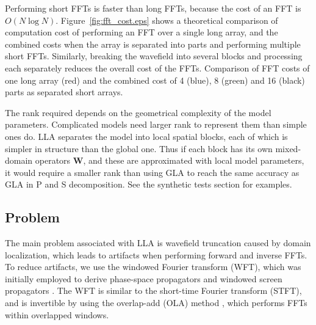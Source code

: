 \documentclass[manuscript,ulem,graphix,revised]{geophysics}
\begin{document}
Performing short FFTs is faster than long FFTs, because the cost of an FFT is $O(N\log{N})$. Figure~\ref{fig:fft_cost.eps} shows a theoretical comparison of computation cost of performing an FFT over a single long array, and the combined costs when the array is separated into parts and performing multiple short FFTs. 
Similarly, breaking the wavefield into several blocks and processing each separately reduces the overall cost of the FFTs. 
{
Comparison of FFT costs of one long array (red) and the combined cost of 4 (blue), 8 (green) and 16 (black) parts as separated short arrays.
}


The rank required depends on the geometrical complexity of the model parameters. Complicated models need larger rank to represent them than simple ones do. LLA separates the model into local spatial blocks, each of which is simpler in structure than the global one. Thus if each block has its own mixed-domain operators $\boldsymbol{W}$, and these are approximated with local model parameters, it would require a smaller rank than using GLA to reach the same accuracy as GLA in P and S decomposition. See the synthetic tests section for examples.

\subsection{Problem}
\indent\indent
The main problem associated with LLA is wavefield truncation caused by domain localization, which leads to artifacts when performing forward and inverse FFTs. To reduce artifacts, we use the windowed Fourier transform (WFT), which was initially employed to derive phase-space propagators \citep{steinberg95} and windowed screen propagators \citep{wu97}. The WFT is similar to the short-time Fourier transform (STFT), and is invertible by using the overlap-add (OLA) method \citep{crochiere80, liao93}, which performs FFTs within overlapped windows.
\end{document}
